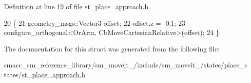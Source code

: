 Definition at line 19 of file st\+\_\+place\+\_\+approach.\+h.


\begin{DoxyCode}
20     \{
21         geometry\_msgs::Vector3 offset;
22         offset.z = -0.1;
23         configure\_orthogonal<OrArm, CbMoveCartesianRelative>(offset);
24     \}
\end{DoxyCode}


The documentation for this struct was generated from the following file\+:\begin{DoxyCompactItemize}
\item 
smacc\+\_\+sm\+\_\+reference\+\_\+library/sm\+\_\+moveit\+\_/include/sm\+\_\+moveit\+\_/states/place\+\_\+states/\hyperlink{4_2include_2sm__moveit__4_2states_2place__states_2st__place__approach_8h}{st\+\_\+place\+\_\+approach.\+h}\end{DoxyCompactItemize}
